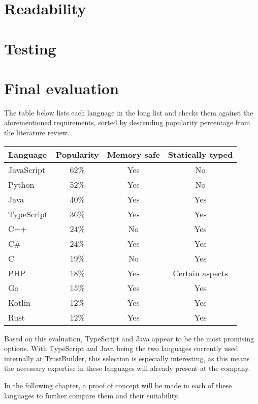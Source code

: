 \section{Readability}

\section{Testing}

\section{Final evaluation}
The table below lists each language in the long list and checks them against the aforementioned requirements, sorted by descending popularity percentage from the literature review.
\begin{center}
\begin{tabular}{|l| c c c |}
    \hline
    Language & Popularity & Memory safe & Statically typed \\
    \hline
    JavaScript & 62\% & Yes & No \\
    Python     & 52\% & Yes & No \\
    Java       & 40\% & Yes & Yes \\
    TypeScript & 36\% & Yes & Yes \\
    C++        & 24\% & No  & Yes \\
    C\#        & 24\% & Yes & Yes \\
    C          & 19\% & No  & Yes \\
    PHP        & 18\% & Yes & Certain aspects \\
    Go         & 15\% & Yes & Yes \\
    Kotlin     & 12\% & Yes & Yes \\
    Rust       & 12\% & Yes & Yes \\
    \hline
\end{tabular}
\end{center}

Based on this evaluation, TypeScript and Java appear to be the most promising options. With TypeScript and Java being the two languages currently used internally at TrustBuilder, this selection is especially interesting, as this means the necessary expertise in these languages will already present at the company. 

In the following chapter, a proof of concept will be made in each of these languages to further compare them and their suitability.
